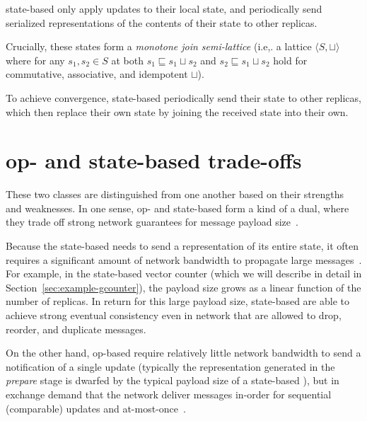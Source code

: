 \begin{definition}
  state-based \CRDTs only apply updates to their local state, and periodically
  send serialized representations of the contents of their state to other
  replicas.

  Crucially, these states form a \textit{monotone join semi-lattice} (i.e,. a
  lattice $\langle S, \sqcup \rangle$ where for any $s_1, s_2 \in S$ at both
  $s_1 \sqsubseteq s_1 \sqcup s_2$ and $s_2 \sqsubseteq s_1 \sqcup s_2$ hold for
  commutative, associative, and idempotent $\sqcup$).

  To achieve convergence, state-based \CRDTs periodically send their state to
  other replicas, which then replace their own state by joining the received
  state into their own.
\end{definition}

\section{op- and state-based trade-offs}

These two classes are distinguished from one another based on their strengths
and weaknesses. In one sense, op- and state-based \CRDTs form a kind of a dual,
where they trade off strong network guarantees for message payload
size~\citep{baquero14}.

Because the state-based \CRDT needs to send a representation of its entire state,
it often requires a significant amount of network bandwidth to propagate large
messages~\citep{almedia18}. For example, in the state-based vector counter
(which we will describe in detail in Section~\ref{sec:example-gcounter}), the
payload size grows as a linear function of the number of replicas. In return for
this large payload size, state-based \CRDTs are able to achieve strong eventual
consistency even in network that are allowed to drop, reorder, and duplicate
messages.

On the other hand, op-based \CRDTs require relatively little network bandwidth
to send a notification of a single update (typically the representation
generated in the \textit{prepare} stage is dwarfed by the typical payload size
of a state-based \CRDT), but in exchange demand that the network deliver
messages in-order for sequential (comparable) updates and
at-most-once~\citep{shapiro11}.

